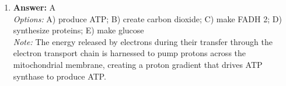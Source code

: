 \documentclass[12pt]{article}
\begin{document}
\begin{enumerate}[label=\arabic*.]
\\ \textit{Options:} A) They have flowers that bloom for several years before producing seeds; B) They have a unique leaf structure; C) They can survive in extremely cold climates; D) They produce large seeds; E) Their seeds can remain dormant for up to a century before germinating
\\ \textit{Note:} The correct answer highlights that cycads exhibit an extraordinary reproductive strategy where their flowers can persist for several years before seed production, distinguishing them from other seed plants that typically have shorter blooming periods.
\item \textbf{Answer:} A
\\ \textit{Options:} A) produce ATP; B) create carbon dioxide; C) make FADH 2; D) synthesize proteins; E) make glucose
\\ \textit{Note:} The energy released by electrons during their transfer through the electron transport chain is harnessed to pump protons across the mitochondrial membrane, creating a proton gradient that drives ATP synthase to produce ATP.
\end{enumerate}
\end{document}
